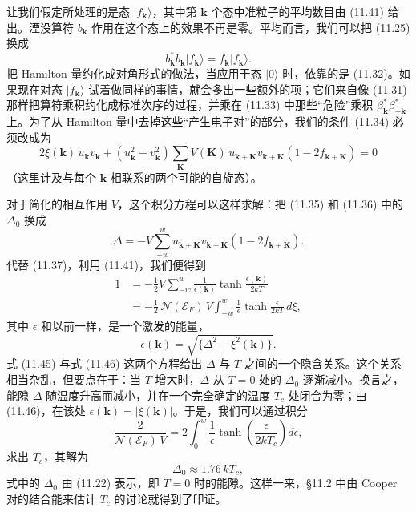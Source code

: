 让我们假定所处理的是态 $|f_{\mathbf{k}}\rangle$，其中第 $\mathbf{k}$ 个态中准粒子的平均数目由 (11.41) 给出。湮没算符 $b_{\mathbf{k}}$ 作用在这个态上的效果不再是零。平均而言，我们可以把 (11.25) 换成
\begin{equation*}
b^{*}_{\mathbf{k}}b_{\mathbf{k}}|f_{\mathbf{k}}\rangle=f_{\mathbf{k}}|f_{\mathbf{k}}\rangle.
\tag{11.42}
\end{equation*}
把 Hamilton 量约化成对角形式的做法，当应用于态 $|0\rangle$ 时，依靠的是 (11.32)。如果现在对态 $|f_{\mathbf{k}}\rangle$ 试着做同样的事情，就会多出一些额外的项；它们来自像 (11.31) 那样把算符乘积约化成标准次序的过程，并乘在 (11.33) 中那些“危险”乘积 $\beta^{*}_{\mathbf{k}}\beta^{*}_{-\mathbf{k}}$ 上。为了从 Hamilton 量中去掉这些“产生电子对”的部分，我们的条件 (11.34) 必须改成为
\begin{equation*}
2\xi(\mathbf{k})\,u_{\mathbf{k}}v_{\mathbf{k}}+(u^{2}_{\mathbf{k}}-v^{2}_{\mathbf{k}})\sum_{\mathbf{K}}V(\mathbf{K})\,u_{\mathbf{k}+\mathbf{K}}v_{\mathbf{k}+\mathbf{K}}(1-2f_{\mathbf{k}+\mathbf{K}})=0
\tag{11.43}
\end{equation*}
（这里计及与每个 $\mathbf{k}$ 相联系的两个可能的自旋态）。

对于简化的相互作用 $V$，这个积分方程可以这样求解：把 (11.35) 和 (11.36) 中的 $\Delta_{0}$ 换成
\begin{equation*}
\Delta=-V\sum_{-w}^{w}u_{\mathbf{k}+\mathbf{K}}v_{\mathbf{k}+\mathbf{K}}(1-2f_{\mathbf{k}+\mathbf{K}}).
\tag{11.44}
\end{equation*}
代替 (11.37)，利用 (11.41)，我们便得到
\begin{align*}
1&=-\frac{1}{2}V\sum_{-w}^{w}\frac{1}{\epsilon(\mathbf{k})}\tanh\frac{\epsilon(\mathbf{k})}{2kT}\\
&=-\frac{1}{2}\,\mathcal{N}(\mathcal{E}_{F})\,V\int_{-w}^{w}\frac{1}{\epsilon}\tanh\frac{\epsilon}{2kT}\,d\xi,
\tag{11.45}
\end{align*}
其中 $\epsilon$ 和以前一样，是一个激发的能量，
\begin{equation*}
\epsilon(\mathbf{k})=\sqrt{\{\Delta^{2}+\xi^{2}(\mathbf{k})\}}.
\tag{11.46}
\end{equation*}
式 (11.45) 与式 (11.46) 这两个方程给出 $\Delta$ 与 $T$ 之间的一个隐含关系。这个关系相当杂乱，但要点在于：当 $T$ 增大时，$\Delta$ 从 $T=0$ 处的 $\Delta_{0}$ 逐渐减小。换言之，能隙 $\Delta$ 随温度升高而减小，并在一个完全确定的温度 $T_{c}$ 处闭合为零；由 (11.46)，在该处 $\epsilon(\mathbf{k})=|\xi(\mathbf{k})|$。于是，我们可以通过积分
\begin{equation*}
\frac{2}{\mathcal{N}(\mathcal{E}_{F})\,V}=2\int_{0}^{w}\frac{1}{\epsilon}\tanh\left(\frac{\epsilon}{2kT_{c}}\right)d\epsilon,
\tag{11.47}
\end{equation*}
求出 $T_{c}$，其解为
\begin{equation*}
\Delta_{0}\approx 1.76\,kT_{c},
\tag{11.48}
\end{equation*}
式中的 $\Delta_{0}$ 由 (11.22) 表示，即 $T=0$ 时的能隙。这样一来，§11.2 中由 Cooper 对的结合能来估计 $T_{c}$ 的讨论就得到了印证。

